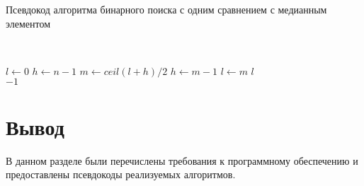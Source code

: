 \begin{algorithm}[H]
	\caption{Псевдокод алгоритма бинарного поиска с одним сравнением с медианным элементом}
	\label{alg:two-comp}
	\\
	\begin{algorithmic}[1]
		\State $l\gets 0$
		\State $h\gets n - 1$
		\State $m\gets ceil(l + h) / 2$
			\State $h\gets m - 1$
		\Else
			\State $l\gets m$
		\EndIf
		\EndWhile
			\Return $l$
		\EndIf \\
		\Return $-1$
		\EndFunction
	\end{algorithmic}
\end{algorithm}

\section*{Вывод}
В данном разделе были перечислены требования к программному обеспечению и предоставлены псевдокоды реализуемых алгоритмов.